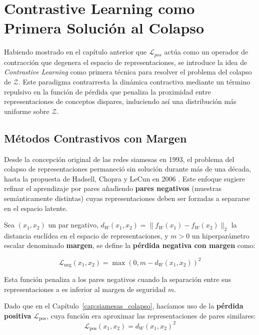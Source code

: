 \chapter{Contrastive Learning como Primera Solución al Colapso}
\label{cap:contrastive}

Habiendo mostrado en el capítulo anterior que $\mathcal{L}_{pos}$ actúa como un operador de contracción que degenera el espacio de representaciones, se introduce la idea de \textit{Contrastive Learning} como primera técnica para resolver el problema del colapso de $\mathcal{Z}$. Este paradigma contrarresta la dinámica contractiva mediante un término repulsivo en la función de pérdida que penaliza la proximidad entre representaciones de conceptos dispares, induciendo así una distribución más uniforme sobre $\mathcal{Z}$.


\section{Métodos Contrastivos con Margen}
\label{sec:contrastive_hadsell}

Desde la concepción original de las redes siamesas en 1993, el problema del colapso de representaciones permaneció sin solución durante más de una década, hasta la propuesta de Hadsell, Chopra y LeCun en 2006 \cite{hadsell2006dimensionality}. Este enfoque sugiere refinar el aprendizaje por pares añadiendo \textbf{pares negativos} (muestras semánticamente distintas) cuyas representaciones deben ser forzadas a separarse en el espacio latente.

\begin{definition}

Sea $(x_1, x_2)$ un par negativo, $d_W(x_1, x_2) = \| f_W(x_1) - f_W(x_2) \|_2$ la distancia euclídea en el espacio de representaciones, y $m > 0$ un hiperparámetro escalar denominado \textbf{margen}, se define la \textbf{pérdida negativa con margen} como:

\begin{equation}
\mathcal{L}_{\text{neg}}(x_{1}, x_{2}) = \max\left(0, m - d_W(x_1, x_2)\right)^2
\label{eq:L_neg}
\end{equation}

\end{definition}

Esta función penaliza a los pares negativos cuando la separación entre sus representaciones a es inferior al margen de seguridad $m$.

Dado que en el Capítulo~\ref{cap:siamesas_colapso}, hacíamos uso de la \textbf{pérdida positiva} $\mathcal{L}_{\text{pos}}$, cuya función era aproximar las representaciones de pares similares:
\begin{equation}
\mathcal{L}_{\text{pos}}(x_1, x_2) = d_W(x_1, x_2)^2
\label{eq:L_pos_cap4}
\end{equation}

